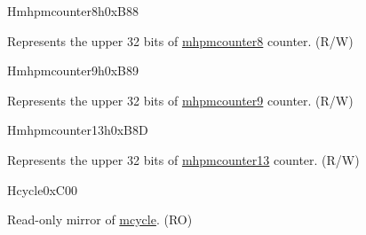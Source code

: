\begin{register}{H}{mhpmcounter8h}{0xB88}\label{regdesc:MHPMCOUNTER8H}
%
\regnewline%
\begin{regdesc}\begin{reglist}
\label{fielddesc:MHPMCOUNTER8H}\item [MHPMCOUNTER8H] Represents the upper 32 bits of \hyperref[regdesc:MHPMCOUNTER8]{mhpmcounter8} counter. (R/W)
\end{reglist}\end{regdesc}
\end{register}

\begin{register}{H}{mhpmcounter9h}{0xB89}\label{regdesc:MHPMCOUNTER9H}
%
\regnewline%
\begin{regdesc}\begin{reglist}
\label{fielddesc:MHPMCOUNTER9H}\item [MHPMCOUNTER9H] Represents the upper 32 bits of \hyperref[regdesc:MHPMCOUNTER9]{mhpmcounter9} counter. (R/W)
\end{reglist}\end{regdesc}
\end{register}

\begin{register}{H}{mhpmcounter13h}{0xB8D}\label{regdesc:MHPMCOUNTER13H}
%
\regnewline%
\begin{regdesc}\begin{reglist}
\label{fielddesc:MHPMCOUNTER13H}\item [MHPMCOUNTER13H] Represents the upper 32 bits of \hyperref[regdesc:MHPMCOUNTER13]{mhpmcounter13} counter. (R/W)
\end{reglist}\end{regdesc}
\end{register}







\begin{register}{H}{cycle}{0xC00}\label{regdesc:CYCLE}
%
\regnewline%
\begin{regdesc}\begin{reglist}
\label{fielddesc:CYCLE}\item [CYCLE] Read-only mirror of \hyperref[regdesc:MCYCLE]{mcycle}. (RO)
\end{reglist}\end{regdesc}
\end{register}

